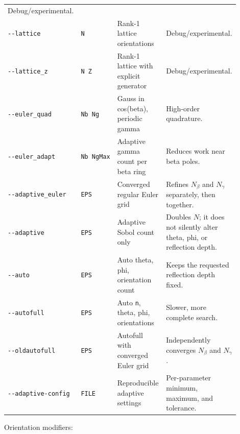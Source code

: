 \documentclass[
  10pt,
  a4paper,
]{article}
\begin{document}
\begin{longtable}[]{@{}L{0.20\linewidth}L{0.14\linewidth}L{0.28\linewidth}L{0.28\linewidth}@{}}
Debug/experimental. \\
\texttt{-\/-lattice} & \texttt{N} & Rank-1 lattice orientations &
Debug/experimental. \\
\texttt{-\/-lattice\_z} & \texttt{N\ Z} & Rank-1 lattice with explicit
generator & Debug/experimental. \\
\texttt{-\/-euler\_quad} & \texttt{Nb\ Ng} & Gauss in cos(beta),
periodic gamma & High-order quadrature. \\
\texttt{-\/-euler\_adapt} & \texttt{Nb\ NgMax} & Adaptive gamma count
per beta ring & Reduces work near beta poles. \\
\texttt{-\/-adaptive\_euler} & \texttt{EPS} & Converged regular Euler grid &
Refines \(N_\beta\) and \(N_\gamma\) separately, then together. \\
\texttt{-\/-adaptive} & \texttt{EPS} & Adaptive Sobol count only & Doubles
\(N\); it does not silently alter theta, phi, or reflection depth. \\
\texttt{-\/-auto} & \texttt{EPS} & Auto theta, phi, orientation count &
Keeps the requested reflection depth fixed. \\
\texttt{-\/-autofull} & \texttt{EPS} & Auto \texttt{n}, theta, phi,
orientations & Slower, more complete search. \\
\texttt{-\/-oldautofull} & \texttt{EPS} & Autofull with converged Euler
grid & Independently converges \(N_\beta\) and \(N_\gamma\). \\
\texttt{-\/-adaptive-config} & \texttt{FILE} & Reproducible adaptive
settings & Per-parameter minimum, maximum, and tolerance. \\
\end{longtable}

Orientation modifiers:
\end{document}
